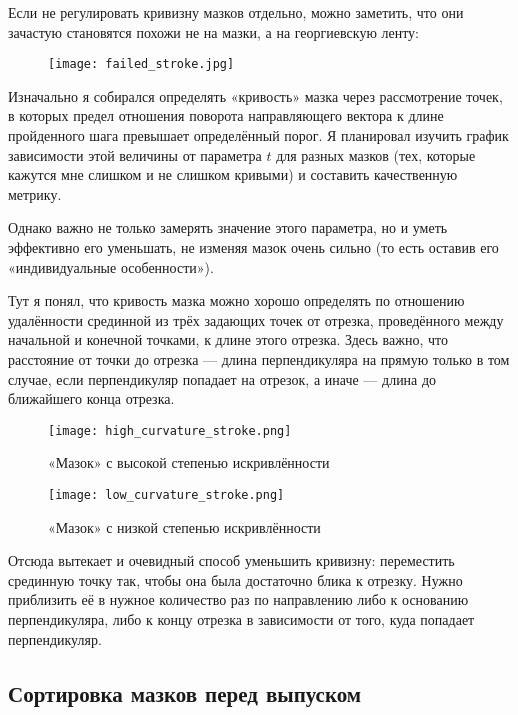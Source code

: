 Если не регулировать кривизну мазков отдельно, можно заметить,
что они зачастую становятся похожи не на мазки, а на георгиевскую ленту:

\begin{figure}
    \centering
    \texttt{[image: failed\_stroke.jpg]}
    \label{fig:failed_stroke}
\end{figure}

Изначально я собирался определять «кривость» мазка через рассмотрение точек,
в которых предел отношения поворота направляющего вектора к длине пройденного шага превышает определённый порог.
Я планировал изучить график зависимости этой величины от параметра $t$ для разных мазков
(тех, которые кажутся мне слишком и не слишком кривыми) и составить качественную метрику.

Однако важно не только замерять значение этого параметра, но и уметь эффективно его уменьшать,
не изменяя мазок очень сильно (то есть оставив его «индивидуальные особенности»).

Тут я понял, что кривость мазка можно хорошо определять по отношению удалённости срединной из трёх задающих точек от отрезка,
проведённого между начальной и конечной точками, к длине этого отрезка.
Здесь важно, что расстояние от точки до отрезка — длина перпендикуляра на прямую только в том случае,
если перпендикуляр попадает на отрезок, а иначе — длина до ближайшего конца отрезка.

\begin{figure}
    \centering
    \texttt{[image: high\_curvature\_stroke.png]}
    \caption{«Мазок» с высокой степенью искривлённости}
    \label{fig:high_curvature_stroke}
\end{figure}

\begin{figure}
    \centering
    \texttt{[image: low\_curvature\_stroke.png]}
    \caption{«Мазок» с низкой степенью искривлённости}
    \label{fig:low_curvature_stroke}
\end{figure}

Отсюда вытекает и очевидный способ уменьшить кривизну: переместить срединную точку так, чтобы она была достаточно блика к отрезку.
Нужно приблизить её в нужное количество раз по направлению либо к основанию перпендикуляра,
либо к концу отрезка в зависимости от того, куда попадает перпендикуляр.


\subsection{Сортировка мазков перед выпуском}\label{subsec:stroke_sorting}

